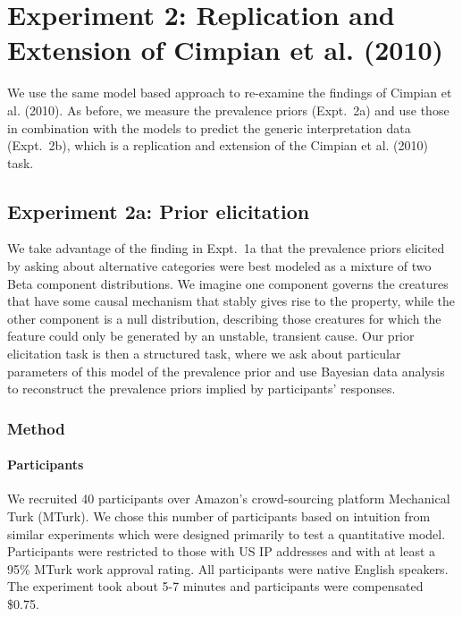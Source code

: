 \documentclass[floatsintext,doc]{apa6}
\let\oldparagraph\paragraph
\renewcommand{\paragraph}[1]{\oldparagraph{#1}\mbox{}}
\begin{document}
\hypertarget{preliminary-study-replication-and-extension-of-cimpian-et-al.-2010}{%
\section{Experiment 2: Replication and Extension of Cimpian et al. (2010)}\label{preliminary-study-replication-and-extension-of-cimpian-et-al.-2010}}

We use the same model based approach to re-examine the findings of Cimpian et al. (2010). As before, we measure the prevalence priors (Expt.~2a) and use those in combination with the models to predict the generic interpretation data (Expt.~2b), which is a replication and extension of the Cimpian et al. (2010) task. 

\subsection{Experiment 2a: Prior elicitation}

We take advantage of the finding in Expt.~1a that the prevalence priors elicited by asking about alternative categories were best modeled as a mixture of two Beta component distributions. 
We imagine one component governs the creatures that have some causal mechanism that stably gives rise to the property, while the other component is a null distribution, describing those creatures for which the feature could only be generated by an unstable, transient cause. 
Our prior elicitation task is then a structured task, where we ask about particular parameters of this model of the prevalence prior and use Bayesian data analysis to reconstruct the prevalence priors implied by participants' responses. 


\subsubsection{Method}\label{method}

\paragraph{Participants}
We recruited 40 participants over Amazon's crowd-sourcing platform
Mechanical Turk (MTurk). We chose this number of participants based on
intuition from similar experiments which were designed primarily to test
a quantitative model. Participants were restricted to those with US IP
addresses and with at least a 95\% MTurk work approval rating. All
participants were native English speakers. The experiment took about 5-7
minutes and participants were compensated \$0.75.
\end{document}
